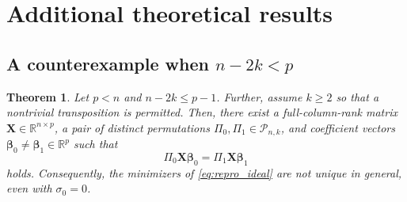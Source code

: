 \documentclass[11pt, reqno]{amsart}
\newcommand{\R}{\mathbb{R}}
\renewcommand{\le}{\leqslant}
\renewcommand{\ge}{\geqslant}
\newcommand{\mP}{\mathcal{P}}
\newcommand{\1}{\mbox{1}\hspace{-0.25em}\mbox{l}}
\theoremstyle{definition}\newtheorem{problem}{Problem}[section]
\theoremstyle{definition}\newtheorem{definition}[problem]{Definition}
\theoremstyle{remark}\newtheorem{assumption}{Assumption}
\theoremstyle{remark}\newtheorem{remark}[problem]{Remark}
\theoremstyle{definition}\newtheorem{example}[problem]{Example}
\theoremstyle{plain}\newtheorem{theorem}[problem]{Theorem}
\theoremstyle{plain}\newtheorem{question}[problem]{Question}
\theoremstyle{plain}\newtheorem{lemma}[problem]{Lemma}
\theoremstyle{plain}\newtheorem{proposition}[problem]{Proposition}
\theoremstyle{plain}\newtheorem{corollary}[problem]{Corollary}
\theoremstyle{plain}\newtheorem{conjecture}[problem]{Conjecture}
\begin{document}
\section{Additional theoretical results}\label{section:appendix theory}

\subsection{A counterexample when $n-2k < p$}
\begin{theorem}\label{thm:counterexample}
    Let $p<n$ and $n-2k \le p - 1$. Further, assume $k \ge 2$ so that a nontrivial transposition is permitted.
Then, there exist a full-column-rank matrix $\bm{X} \in \R^{n\times p}$, a pair of distinct permutations $\Pi_0,\Pi_1 \in \mP_{n,k}$,
and coefficient vectors $\bm{\beta}_0 \ne \bm{\beta}_1 \in \R^p$ such that
\[
\Pi_0 \bm{X} \bm{\beta}_0 = \Pi_1 \bm{X} \bm{\beta}_1
\]
holds. Consequently, the minimizers of \eqref{eq:repro_ideal} are not unique in general, even with $\sigma_0 = 0$.
\end{theorem}
\end{document}
